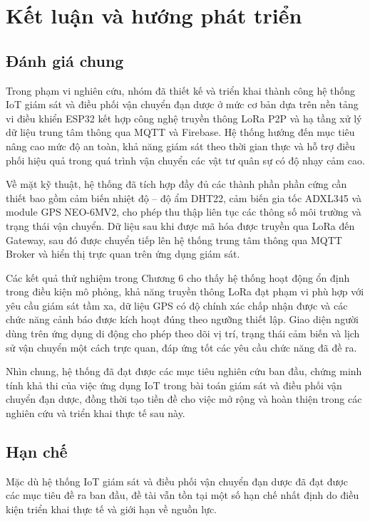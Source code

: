 \chapter{Kết luận và hướng phát triển}
\section{Đánh giá chung}
Trong phạm vi nghiên cứu, nhóm đã thiết kế và triển khai thành công hệ thống IoT giám sát và điều phối vận chuyển đạn dược ở mức cơ bản dựa trên nền tảng vi điều khiển ESP32 kết hợp công nghệ truyền thông LoRa P2P và hạ tầng xử lý dữ liệu trung tâm thông qua MQTT và Firebase. Hệ thống hướng đến mục tiêu nâng cao mức độ an toàn, khả năng giám sát theo thời gian thực và hỗ trợ điều phối hiệu quả trong quá trình vận chuyển các vật tư quân sự có độ nhạy cảm cao.

Về mặt kỹ thuật, hệ thống đã tích hợp đầy đủ các thành phần phần cứng cần thiết bao gồm cảm biến nhiệt độ – độ ẩm DHT22, cảm biến gia tốc ADXL345 và module GPS NEO-6MV2, cho phép thu thập liên tục các thông số môi trường và trạng thái vận chuyển. Dữ liệu sau khi được mã hóa được truyền qua LoRa đến Gateway, sau đó được chuyển tiếp lên hệ thống trung tâm thông qua MQTT Broker và hiển thị trực quan trên ứng dụng giám sát.

Các kết quả thử nghiệm trong Chương 6 cho thấy hệ thống hoạt động ổn định trong điều kiện mô phỏng, khả năng truyền thông LoRa đạt phạm vi phù hợp với yêu cầu giám sát tầm xa, dữ liệu GPS có độ chính xác chấp nhận được và các chức năng cảnh báo được kích hoạt đúng theo ngưỡng thiết lập. Giao diện người dùng trên ứng dụng di động cho phép theo dõi vị trí, trạng thái cảm biến và lịch sử vận chuyển một cách trực quan, đáp ứng tốt các yêu cầu chức năng đã đề ra.

Nhìn chung, hệ thống đã đạt được các mục tiêu nghiên cứu ban đầu, chứng minh tính khả thi của việc ứng dụng IoT trong bài toán giám sát và điều phối vận chuyển đạn dược, đồng thời tạo tiền đề cho việc mở rộng và hoàn thiện trong các nghiên cứu và triển khai thực tế sau này.

\section{Hạn chế}

Mặc dù hệ thống IoT giám sát và điều phối vận chuyển đạn dược đã đạt được các mục tiêu đề ra ban đầu, đề tài vẫn tồn tại một số hạn chế nhất định do điều kiện triển khai thực tế và giới hạn về nguồn lực.

